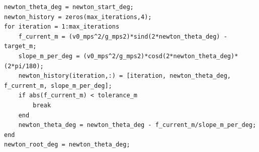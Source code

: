 \documentclass[border=12pt]{standalone}
\begin{document}
\begin{lstlisting}[style=matlab]
newton_theta_deg = newton_start_deg;
newton_history = zeros(max_iterations,4);
for iteration = 1:max_iterations
    f_current_m = (v0_mps^2/g_mps2)*sind(2*newton_theta_deg) - target_m;
    slope_m_per_deg = (v0_mps^2/g_mps2)*cosd(2*newton_theta_deg)*(2*pi/180);
    newton_history(iteration,:) = [iteration, newton_theta_deg, f_current_m, slope_m_per_deg];
    if abs(f_current_m) < tolerance_m
        break
    end
    newton_theta_deg = newton_theta_deg - f_current_m/slope_m_per_deg;
end
newton_root_deg = newton_theta_deg;
\end{lstlisting}
\end{document}
